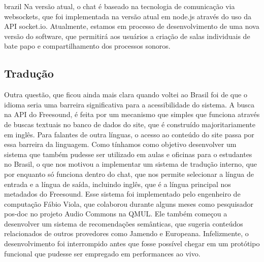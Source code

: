 \begin{otherlanguage*}{brazil}
Na versão atual, o chat é baseado na tecnologia de comunicação via websockets, que foi implementada na versão atual em node.js através do uso da API socket.io. Atualmente, estamos em processo de desenvolvimento de uma nova versão do software, que permitirá aos usuários a criação de salas individuais de bate papo e compartilhamento dos processos sonoros.








\subsection{Tradução}

Outra questão, que ficou ainda mais clara quando voltei ao Brasil foi de que o idioma seria uma barreira significativa para a acessibilidade do sistema. A busca na API do Freesound, é feita por um mecanismo que simples que funciona através de buscas textuais no banco de dados do site, que é construído majoritariamente em inglês. Para falantes de outra línguas, o acesso ao conteúdo do site passa por essa barreira da linguagem. Como tínhamos como objetivo desenvolver um sistema que também pudesse ser utilizado em aulas e oficinas para o estudantes no Brasil, o que nos motivou a implementar um sistema de tradução interno, que por enquanto só funciona dentro do chat, que nos permite selecionar a língua de entrada e a língua de saída, incluindo inglês, que é a língua principal nos metadados do Freesound. Esse sistema foi implementado pelo engenheiro de computação Fábio Viola, que colaborou durante alguns meses como pesquisador pos-doc no projeto Audio Commons na QMUL. Ele também começou a desenvolver um sistema de recomendações semânticas\cite{Viola2018}, que sugeria conteúdos relacionados de outros provedores como Jamendo e Europeana. Infelizmente, o desenvolvimento foi interrompido antes que fosse possível chegar em um protótipo funcional que pudesse ser empregado em performances ao vivo.


\end{otherlanguage*}
